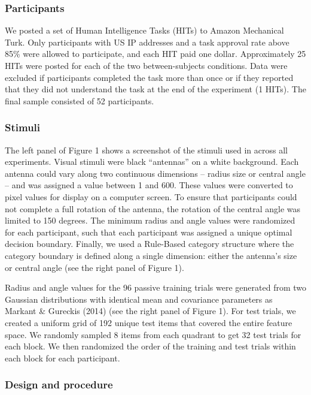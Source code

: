 \documentclass[10pt, letterpaper]{article}
\begin{document}
\subsubsection{Participants}\label{participants}

We posted a set of Human Intelligence Tasks (HITs) to Amazon Mechanical
Turk. Only participants with US IP addresses and a task approval rate
above 85\% were allowed to participate, and each HIT paid one dollar.
Approximately 25 HITs were posted for each of the two between-subjects
conditions. Data were excluded if participants completed the task more
than once or if they reported that they did not understand the task at
the end of the experiment (1 HITs). The final sample consisted of 52
participants.

\subsubsection{Stimuli}\label{stimuli}

The left panel of Figure 1 shows a screenshot of the stimuli used in
across all experiments. Visual stimuli were black ``antennas'' on a
white background. Each antenna could vary along two continuous
dimensions -- radius size or central angle -- and was assigned a value
between 1 and 600. These values were converted to pixel values for
display on a computer screen. To ensure that participants could not
complete a full rotation of the antenna, the rotation of the central
angle was limited to 150 degrees. The minimum radius and angle values
were randomized for each participant, such that each participant was
assigned a unique optimal decision boundary. Finally, we used a
Rule-Based category structure where the category boundary is defined
along a single dimension: either the antenna's size or central angle
(see the right panel of Figure 1).

Radius and angle values for the 96 passive training trials were
generated from two Gaussian distributions with identical mean and
covariance parameters as Markant \& Gureckis (2014) (see the right panel
of Figure 1). For test trials, we created a uniform grid of 192 unique
test items that covered the entire feature space. We randomly sampled 8
items from each quadrant to get 32 test trials for each block. We then
randomized the order of the training and test trials within each block
for each participant.

\subsubsection{Design and procedure}\label{design-and-procedure}
\end{document}
